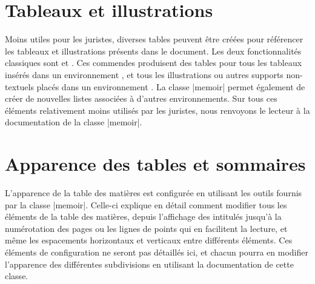 \section{Tableaux et illustrations}

Moins utiles pour les juristes, diverses tables peuvent être créées pour référencer les tableaux et illustrations présents dans le document. Les deux fonctionnalités classiques sont  et . Ces commendes produisent des tables pour tous les tableaux insérés dans un environnement , et tous les illustrations ou autres supports non-textuels placés dans un environnement . La classe |memoir| permet également de créer de nouvelles listes associées à d'autres environnements. Sur tous ces éléments relativement moins utilisés par les juristes, nous renvoyons le lecteur à la documentation de la classe |memoir|.



\section{Apparence des tables et sommaires}

L'apparence de la table des matières est configurée en utilisant les outils fournis par la classe |memoir|. Celle-ci explique en détail comment modifier tous les éléments de la table des matières, depuis l'affichage des intitulés jusqu'à la numérotation des pages ou les lignes de points qui en facilitent la lecture, et même les espacements horizontaux et verticaux entre différents éléments. Ces éléments de configuration ne seront pas détaillés ici, et chacun pourra en modifier l'apparence des différentes subdivisions en utilisant la documentation de cette classe.

\begin{noprint}
\renewcommand*{\cftbookpresnum}{\space}
\renewcommand*{\cftbookaftersnum}{.}
\renewcommand*{\cftbookaftersnumb}{\space}
\renewcommand*{\cftbookfont}{\if@modern\sffamily\fi\Large\scshape\hfil}
\renewcommand*{\cftbookpagefont}{\normalsize}
\setlength{\cftbeforebookskip}{2\baselineskip}
\end{noprint}

\begin{noprint}
\renewcommand*{\cftpartpresnum}{\space}
\renewcommand*{\cftpartaftersnum}{.}
\renewcommand*{\cftpartaftersnumb}{\space}
\renewcommand*{\cftpartfont}{\if@modern\sffamily\fi\large\scshape\hfil}
\renewcommand*{\cftpartpagefont}{\normalsize}
\setlength{\cftbeforepartskip}{\baselineskip}
\end{noprint}

